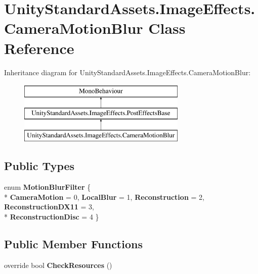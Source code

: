 \hypertarget{class_unity_standard_assets_1_1_image_effects_1_1_camera_motion_blur}{}\section{Unity\+Standard\+Assets.\+Image\+Effects.\+Camera\+Motion\+Blur Class Reference}
\label{class_unity_standard_assets_1_1_image_effects_1_1_camera_motion_blur}
Inheritance diagram for Unity\+Standard\+Assets.\+Image\+Effects.\+Camera\+Motion\+Blur\+:\begin{figure}[H]
\begin{center}
\leavevmode
\includegraphics[height=3.000000cm]{class_unity_standard_assets_1_1_image_effects_1_1_camera_motion_blur}
\end{center}
\end{figure}
\subsection*{Public Types}
\begin{DoxyCompactItemize}
\item 
enum {\bfseries Motion\+Blur\+Filter} \{ \\*
{\bfseries Camera\+Motion} = 0, 
{\bfseries Local\+Blur} = 1, 
{\bfseries Reconstruction} = 2, 
{\bfseries Reconstruction\+D\+X11} = 3, 
\\*
{\bfseries Reconstruction\+Disc} = 4
 \}\hypertarget{class_unity_standard_assets_1_1_image_effects_1_1_camera_motion_blur_a5243e3d1f6a29d119409056d2e2ba99f}{}\label{class_unity_standard_assets_1_1_image_effects_1_1_camera_motion_blur_a5243e3d1f6a29d119409056d2e2ba99f}

\end{DoxyCompactItemize}
\subsection*{Public Member Functions}
\begin{DoxyCompactItemize}
\item 
override bool {\bfseries Check\+Resources} ()\hypertarget{class_unity_standard_assets_1_1_image_effects_1_1_camera_motion_blur_a4d123b09d7f7ce64ff061fe228d01fca}{}\label{class_unity_standard_assets_1_1_image_effects_1_1_camera_motion_blur_a4d123b09d7f7ce64ff061fe228d01fca}

\end{DoxyCompactItemize}
